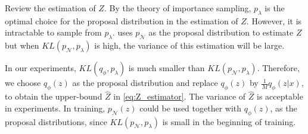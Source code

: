 Review the estimation of $Z$. By the theory of importance sampling, $p_\lambda$ is the optimal choice for the proposal distribution in the estimation of $Z$. However, it is intractable to sample from $p_\lambda$. 
\cite{bauer2019resampled} uses $p_\mathcal{N}$ as the proposal distribution to estimate $Z$ but when $KL(p_\mathcal{N}, p_\lambda)$ is high, the variance of this estimation will be large. 

In our experiments, $KL(q_\phi, p_\lambda)$ is much smaller than $KL(p_\mathcal{N}, p_\lambda)$. Therefore, we choose $q_\phi(z)$ as the proposal distribution and replace $q_\phi(z)$ by $\frac{1}{M}q_\phi(z|x)$, to obtain the upper-bound $\hat{Z}$ in \cref{eq:Z_estimator}. The variance of $\hat{Z}$ is acceptable in experiments.  
In training, $p_\mathcal{N}(z)$ could be used together with $q_\phi(z)$, as the proposal distributions, since $KL(p_\mathcal{N}, p_\lambda)$ is small in the beginning of training.
 